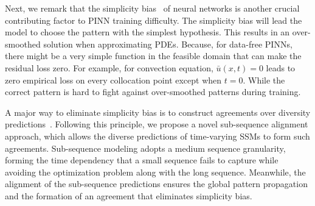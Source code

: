 \documentclass{article}
\theoremstyle{plain}
\theoremstyle{definition}
\theoremstyle{remark}
\begin{document}



Next, we remark that the simplicity bias~\cite{shah2020pitfalls} of neural networks is another crucial contributing factor to PINN training difficulty. The simplicity bias will lead the model to choose the pattern with the simplest hypothesis. This results in an over-smoothed solution when approximating PDEs. Because, for data-free PINNs, there might be a very simple function in the feasible domain that can make the residual loss zero. For example, for convection equation, $\bar u(x,t)=0$ leads to zero empirical loss on every collocation point except when $t=0$. While the correct pattern is hard to fight against over-smoothed patterns during training.

A major way to eliminate simplicity bias is to construct agreements over diversity predictions~\cite{teney2022evading}. Following this principle, we propose a novel sub-sequence alignment approach, which allows the diverse predictions of time-varying SSMs to form such agreements. %
Sub-sequence modeling adopts a medium sequence granularity, forming the time dependency that a small sequence fails to capture while avoiding the optimization problem along with the long sequence. 
Meanwhile, the alignment of the sub-sequence predictions ensures the global pattern propagation and the formation of an agreement that eliminates simplicity bias.
\end{document}
